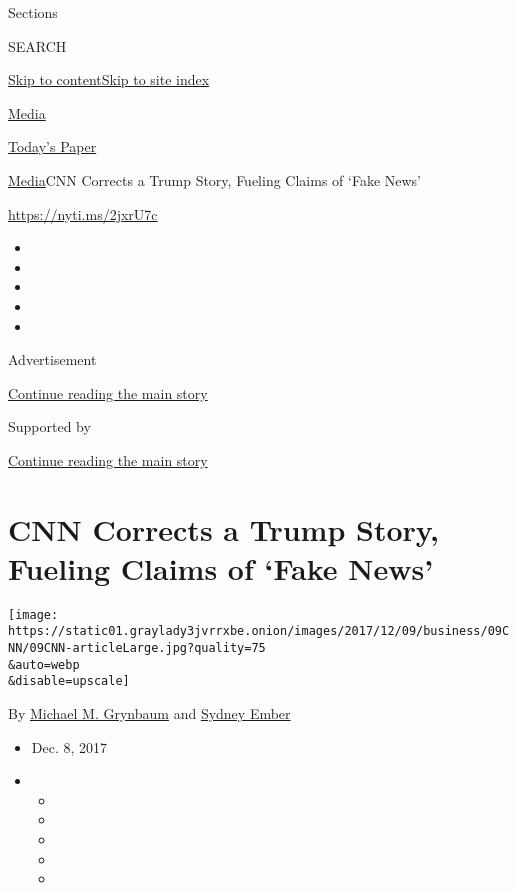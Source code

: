 Sections

SEARCH

\protect\hyperlink{site-content}{Skip to
content}\protect\hyperlink{site-index}{Skip to site index}

\href{https://www.nytimes3xbfgragh.onion/section/business/media}{Media}

\href{https://myaccount.nytimes3xbfgragh.onion/auth/login?response_type=cookie\&client_id=vi}{}

\href{https://www.nytimes3xbfgragh.onion/section/todayspaper}{Today's
Paper}

\href{/section/business/media}{Media}\textbar{}CNN Corrects a Trump
Story, Fueling Claims of `Fake News'

\url{https://nyti.ms/2jxrU7c}

\begin{itemize}
\item
\item
\item
\item
\item
\end{itemize}

Advertisement

\protect\hyperlink{after-top}{Continue reading the main story}

Supported by

\protect\hyperlink{after-sponsor}{Continue reading the main story}

\hypertarget{cnn-corrects-a-trump-story-fueling-claims-of-fake-news}{%
\section{CNN Corrects a Trump Story, Fueling Claims of `Fake
News'}\label{cnn-corrects-a-trump-story-fueling-claims-of-fake-news}}

\texttt{[image: https://static01.graylady3jvrrxbe.onion/images/2017/12/09/business/09CNN/09CNN-articleLarge.jpg?quality=75\\\&auto=webp\\\&disable=upscale]}

By
\href{https://www.nytimes3xbfgragh.onion/by/michael-m-grynbaum}{Michael
M. Grynbaum} and
\href{https://www.nytimes3xbfgragh.onion/by/sydney-ember}{Sydney Ember}

\begin{itemize}
\item
  Dec. 8, 2017
\item
  \begin{itemize}
  \item
  \item
  \item
  \item
  \item
  \end{itemize}
\end{itemize}

